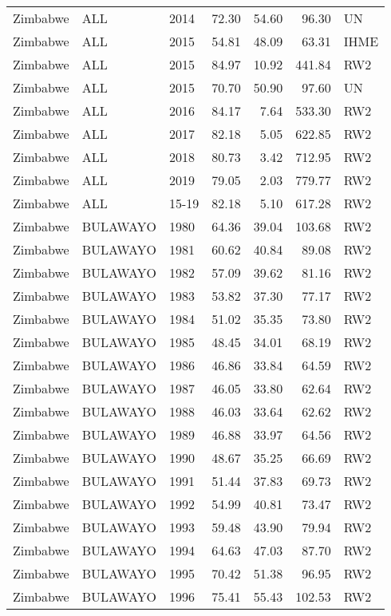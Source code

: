 \begin{longtable}{lllrrrl}
  Zimbabwe & ALL & 2014 & 72.30 & 54.60 & 96.30 & UN \\ 
  Zimbabwe & ALL & 2015 & 54.81 & 48.09 & 63.31 & IHME \\ 
  Zimbabwe & ALL & 2015 & 84.97 & 10.92 & 441.84 & RW2 \\ 
  Zimbabwe & ALL & 2015 & 70.70 & 50.90 & 97.60 & UN \\ 
  Zimbabwe & ALL & 2016 & 84.17 & 7.64 & 533.30 & RW2 \\ 
  Zimbabwe & ALL & 2017 & 82.18 & 5.05 & 622.85 & RW2 \\ 
  Zimbabwe & ALL & 2018 & 80.73 & 3.42 & 712.95 & RW2 \\ 
  Zimbabwe & ALL & 2019 & 79.05 & 2.03 & 779.77 & RW2 \\ 
  Zimbabwe & ALL & 15-19 & 82.18 & 5.10 & 617.28 & RW2 \\ 
  Zimbabwe & BULAWAYO & 1980 & 64.36 & 39.04 & 103.68 & RW2 \\ 
  Zimbabwe & BULAWAYO & 1981 & 60.62 & 40.84 & 89.08 & RW2 \\ 
  Zimbabwe & BULAWAYO & 1982 & 57.09 & 39.62 & 81.16 & RW2 \\ 
  Zimbabwe & BULAWAYO & 1983 & 53.82 & 37.30 & 77.17 & RW2 \\ 
  Zimbabwe & BULAWAYO & 1984 & 51.02 & 35.35 & 73.80 & RW2 \\ 
  Zimbabwe & BULAWAYO & 1985 & 48.45 & 34.01 & 68.19 & RW2 \\ 
  Zimbabwe & BULAWAYO & 1986 & 46.86 & 33.84 & 64.59 & RW2 \\ 
  Zimbabwe & BULAWAYO & 1987 & 46.05 & 33.80 & 62.64 & RW2 \\ 
  Zimbabwe & BULAWAYO & 1988 & 46.03 & 33.64 & 62.62 & RW2 \\ 
  Zimbabwe & BULAWAYO & 1989 & 46.88 & 33.97 & 64.56 & RW2 \\ 
  Zimbabwe & BULAWAYO & 1990 & 48.67 & 35.25 & 66.69 & RW2 \\ 
  Zimbabwe & BULAWAYO & 1991 & 51.44 & 37.83 & 69.73 & RW2 \\ 
  Zimbabwe & BULAWAYO & 1992 & 54.99 & 40.81 & 73.47 & RW2 \\ 
  Zimbabwe & BULAWAYO & 1993 & 59.48 & 43.90 & 79.94 & RW2 \\ 
  Zimbabwe & BULAWAYO & 1994 & 64.63 & 47.03 & 87.70 & RW2 \\ 
  Zimbabwe & BULAWAYO & 1995 & 70.42 & 51.38 & 96.95 & RW2 \\ 
  Zimbabwe & BULAWAYO & 1996 & 75.41 & 55.43 & 102.53 & RW2 \\ 

\end{longtable}
